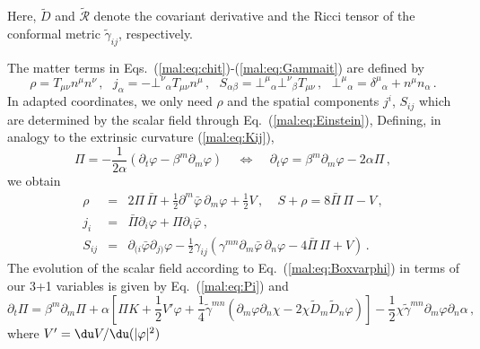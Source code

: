 %
Here, $\tilde{D}$ and $\tilde{\mathcal{R}}$ denote the covariant
derivative and the Ricci tensor of the conformal metric
$\tilde{\gamma}_{ij}$, respectively.

The matter terms in Eqs.~(\ref{mal:eq:chit})-(\ref{mal:eq:Gammait})
are defined by
%
\begin{equation}
  \rho = T_{\mu\nu}n^{\mu}n^{\nu}\,,~~~
  j_{\alpha} = -\bot^{\nu}{}_{\alpha} T_{\mu\nu} n^{\mu}\,,~~~
  S_{\alpha\beta} = \bot^{\mu}{}_{\alpha} \bot^{\nu}{}_{\beta}
        T_{\mu\nu}\,,~~~
  \bot^{\mu}{}_{\alpha}=\delta^{\mu}{}_{\alpha}+n^{\mu}n_{\alpha}\,.
\end{equation}
%
In adapted coordinates, we only need $\rho$ and
the spatial components $j^i$, $S_{ij}$ which are determined
by the scalar field through Eq.~(\ref{mal:eq:Einstein}),
Defining, in analogy to the extrinsic curvature (\ref{mal:eq:Kij}),
%
\begin{equation}
  \Pi = -\frac{1}{2\alpha}
  (
  \partial_t \varphi - \beta^m \partial_m \varphi
  )
  ~~~~~\Leftrightarrow~~~~~
  \partial_t \varphi = \beta^m\partial_m \varphi-2\alpha \Pi\,,
  \label{mal:eq:Pi}
\end{equation}
%
we obtain
%
\begin{eqnarray}
  \rho &=&
  2\Pi \,\bar{\Pi}
  +\frac{1}{2}\partial^m \bar{\varphi}\,\partial_m\varphi
  +\frac{1}{2}V\,,~~~~~
  S+\rho = 8\bar{\Pi}\,\Pi-V\,, \nonumber \\
  j_i &=&
  \bar{\Pi}\partial_i \varphi
  +\Pi \partial_i \bar{\varphi}\,, \nonumber\\
  S_{ij} &=& \partial_{(i}\bar{\varphi}\partial_{j)}\varphi
  - \frac{1}{2}\gamma_{ij}
  \left(
  \gamma^{mn}\partial_m \bar{\varphi}\,\partial_n \varphi
  -4\bar{\Pi} \,\Pi
  +V
  \right)\,. \label{mal:eqn:projectionofstressenergy}
\end{eqnarray}
%
The evolution of the scalar field according to
Eq.~(\ref{mal:eq:Boxvarphi}) in terms of our 3+1 variables
is given by Eq.~(\ref{mal:eq:Pi}) and
%
\begin{equation}
  \partial_t \Pi =
  \beta^m \partial_m \Pi
  + \alpha
  \left[
  \Pi K
  + \frac{1}{2}V'\varphi
  + \frac{1}{4} \tilde{\gamma}^{mn}
  \left(
  \partial_m \varphi\partial_n\chi
  -2\chi\tilde{D}_m\tilde{D}_n \varphi
  \right)
  \right]
  -\frac{1}{2} \chi\tilde{\gamma}^{mn}\partial_m\varphi
  \partial_n \alpha
  \,,
\end{equation}
%
where $V'=\du V/\du (|\varphi|^2)$

